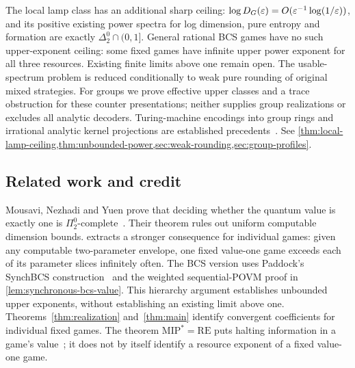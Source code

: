The local lamp class has an additional sharp ceiling: $\log D_G(\varepsilon)=O(\varepsilon^{-1}\log(1/\varepsilon))$, and its positive existing power spectra for log dimension, pure entropy and formation are exactly $\Delta^0_2\cap(0,1]$. General rational BCS games have no such upper-exponent ceiling: some fixed games have infinite upper power exponent for all three resources. Existing finite limits above one remain open. The usable-spectrum problem is reduced conditionally to weak pure rounding of original mixed strategies. For groups we prove effective upper classes and a trace obstruction for these counter presentations; neither supplies group realizations or excludes all analytic decoders. Turing-machine encodings into group rings and irrational analytic kernel projections are established precedents~\cite{Gra14,Aus13,PSZ15}. See \cref{thm:local-lamp-ceiling,thm:unbounded-power,sec:weak-rounding,sec:group-profiles}.

\subsection{Related work and credit}
Mousavi, Nezhadi and Yuen prove that deciding whether the quantum value is exactly one is $\Pi^0_2$-complete~\cite{MNY20,MNY22}. Their theorem rules out uniform computable dimension bounds.  extracts a stronger consequence for individual games: given any computable two-parameter envelope, one fixed value-one game exceeds each of its parameter slices infinitely often. The BCS version uses Paddock's SynchBCS construction~\cite[Section~4.3 and Proposition~4.22]{Pad22} and the weighted sequential-POVM proof in \cref{lem:synchronous-bcs-value}. This hierarchy argument establishes unbounded upper exponents, without establishing an existing limit above one. Theorems~\ref{thm:realization} and~\ref{thm:main} identify convergent coefficients for individual fixed games. The theorem $\mathrm{MIP}^*=\mathrm{RE}$ puts halting information in a game's value~\cite{JNVWY}; it does not by itself identify a resource exponent of a fixed value-one game.

